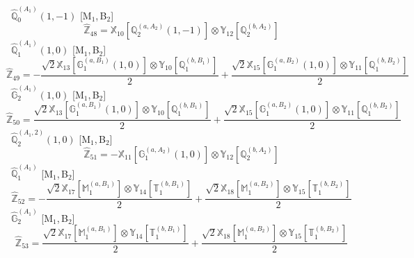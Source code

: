 \documentclass[fleqn,10pt,landscape]{article}
\begin{document}
\begin{itemize}
\noindent {} $\,\,\,\hat{\mathbb{Q}}_{0}^{(A_{1})}(1,-1)$ [M$_{1}$,\,B$_{2}$]
\begin{dmath*}
\hat{\mathbb{Z}}_{48}=\mathbb{X}_{10}[\mathbb{Q}_{2}^{(a,A_{2})}(1,-1)] \otimes\mathbb{Y}_{12}[\mathbb{Q}_{2}^{(b,A_{2})}]
\end{dmath*}
\vspace{4mm}
\noindent {} $\,\,\,\hat{\mathbb{Q}}_{1}^{(A_{1})}(1,0)$ [M$_{1}$,\,B$_{2}$]
\begin{dmath*}
\hat{\mathbb{Z}}_{49}=- \frac{\sqrt{2} \mathbb{X}_{13}[\mathbb{G}_{1}^{(a,B_{1})}(1,0)] \otimes\mathbb{Y}_{10}[\mathbb{Q}_{1}^{(b,B_{1})}]}{2} + \frac{\sqrt{2} \mathbb{X}_{15}[\mathbb{G}_{1}^{(a,B_{2})}(1,0)] \otimes\mathbb{Y}_{11}[\mathbb{Q}_{1}^{(b,B_{2})}]}{2}
\end{dmath*}
\vspace{4mm}
\noindent {} $\,\,\,\hat{\mathbb{G}}_{2}^{(A_{1})}(1,0)$ [M$_{1}$,\,B$_{2}$]
\begin{dmath*}
\hat{\mathbb{Z}}_{50}=\frac{\sqrt{2} \mathbb{X}_{13}[\mathbb{G}_{1}^{(a,B_{1})}(1,0)] \otimes\mathbb{Y}_{10}[\mathbb{Q}_{1}^{(b,B_{1})}]}{2} + \frac{\sqrt{2} \mathbb{X}_{15}[\mathbb{G}_{1}^{(a,B_{2})}(1,0)] \otimes\mathbb{Y}_{11}[\mathbb{Q}_{1}^{(b,B_{2})}]}{2}
\end{dmath*}
\vspace{4mm}
\noindent {} $\,\,\,\hat{\mathbb{Q}}_{2}^{(A_{1},2)}(1,0)$ [M$_{1}$,\,B$_{2}$]
\begin{dmath*}
\hat{\mathbb{Z}}_{51}=- \mathbb{X}_{11}[\mathbb{G}_{1}^{(a,A_{2})}(1,0)] \otimes\mathbb{Y}_{12}[\mathbb{Q}_{2}^{(b,A_{2})}]
\end{dmath*}
\vspace{4mm}
\noindent {} $\,\,\,\hat{\mathbb{Q}}_{1}^{(A_{1})}$ [M$_{1}$,\,B$_{2}$]
\begin{dmath*}
\hat{\mathbb{Z}}_{52}=- \frac{\sqrt{2} \mathbb{X}_{17}[\mathbb{M}_{1}^{(a,B_{1})}] \otimes\mathbb{Y}_{14}[\mathbb{T}_{1}^{(b,B_{1})}]}{2} + \frac{\sqrt{2} \mathbb{X}_{18}[\mathbb{M}_{1}^{(a,B_{2})}] \otimes\mathbb{Y}_{15}[\mathbb{T}_{1}^{(b,B_{2})}]}{2}
\end{dmath*}
\vspace{4mm}
\noindent {} $\,\,\,\hat{\mathbb{G}}_{2}^{(A_{1})}$ [M$_{1}$,\,B$_{2}$]
\begin{dmath*}
\hat{\mathbb{Z}}_{53}=\frac{\sqrt{2} \mathbb{X}_{17}[\mathbb{M}_{1}^{(a,B_{1})}] \otimes\mathbb{Y}_{14}[\mathbb{T}_{1}^{(b,B_{1})}]}{2} + \frac{\sqrt{2} \mathbb{X}_{18}[\mathbb{M}_{1}^{(a,B_{2})}] \otimes\mathbb{Y}_{15}[\mathbb{T}_{1}^{(b,B_{2})}]}{2}

\end{dmath*}
\end{itemize}
\end{document}
